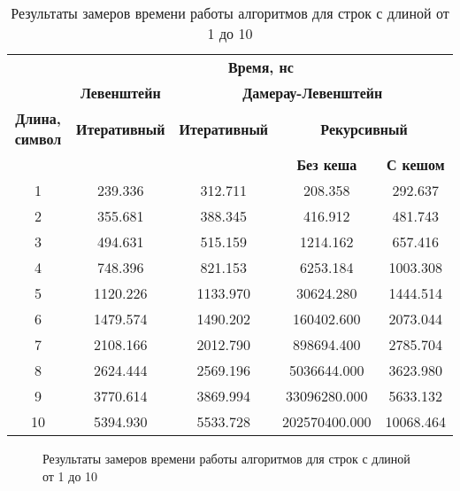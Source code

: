 \begin{table}[ht]
	\small
	\begin{center}
		\begin{threeparttable}
			\caption{Результаты замеров времени работы алгоритмов для строк с длиной от 1 до 10}
			\label{tbl:time}
			\begin{tabular}{|c|c|c|c|c|}
				\hline
				& \multicolumn{4}{c|}{\bfseries Время, нс} \\ \cline{2-5}
				& \multicolumn{1}{c|}{\bfseries Левенштейн}
				& \multicolumn{3}{c|}{\bfseries Дамерау-Левенштейн} \\ \cline{2-5}
				\bfseries Длина, символ & \bfseries Итеративный & \bfseries Итеративный & \multicolumn{2}{c|}{\bfseries Рекурсивный} \\ \cline{4-5}
				& & & \bfseries Без кеша & \bfseries С кешом \\
				\hline
				1 & 239.336 & 312.711 & 208.358 & 292.637 \\
				\hline
				2 & 355.681 & 388.345 & 416.912 & 481.743 \\
				\hline
				3 & 494.631 & 515.159 & 1214.162 & 657.416 \\
				\hline
				4 & 748.396 & 821.153 & 6253.184 & 1003.308 \\
				\hline
				5 &  1120.226 & 1133.970 & 30624.280 & 1444.514 \\
				\hline
				6 & 1479.574 & 1490.202 & 160402.600 & 2073.044 \\
				\hline
				7 & 2108.166 & 2012.790 & 898694.400 & 2785.704 \\
				\hline
				8 & 2624.444 & 2569.196 & 5036644.000 & 3623.980 \\
				\hline
				9 & 3770.614 & 3869.994 & 33096280.000 & 5633.132 \\
				\hline
				10 & 5394.930 & 5533.728 & 202570400.000 & 10068.464 \\
				\hline
			\end{tabular}
		\end{threeparttable}			
	\end{center}
\end{table}


\begin{figure}[h]
	\centering
	
	\caption{Результаты замеров времени работы алгоритмов для строк с длиной от 1 до 10}
	\label{img:linear_graph}
\end{figure}



